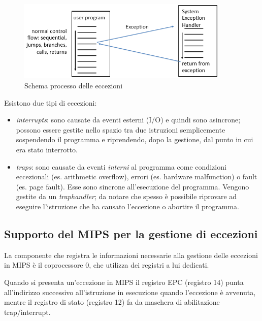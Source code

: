 \documentclass[class=book, crop=false, oneside]{standalone}
\begin{document}
\begin{figure}[!h]
	\centering
	\includegraphics[width=0.9\textwidth,keepaspectratio]{schema-eccezioni}
	\caption{Schema processo delle eccezioni}
\end{figure}
Esistono due tipi di eccezioni:
\begin{itemize}
	\item \emph{interrupts}: sono causate da eventi esterni (I/O) e quindi sono asincrone; possono essere gestite nello spazio tra due istruzioni semplicemente sospendendo il programma e riprendendo, dopo la gestione, dal punto in cui era stato interrotto.
	\item \emph{traps}: sono causate da eventi \emph{interni} al programma come condizioni eccezionali (es. arithmetic overflow), errori (es. hardware malfunction) o fault (es. page fault). Esse sono sincrone all'esecuzione del programma. Vengono gestite da un \emph{traphandler}; da notare che spesso è possibile riprovare ad eseguire l'istruzione che ha causato l'eccezione o abortire il programma.
\end{itemize}

\subsection{Supporto del MIPS per la gestione di eccezioni}
La componente che registra le informazioni necessarie alla gestione delle eccezioni in MIPS è il coprocessore 0, che utilizza dei registri a lui dedicati.

Quando si presenta un'eccezione in MIPS il registro EPC (registro 14) punta all'indirizzo successivo all'istruzione in esecuzione quando l'eccezione è avvenuta, mentre il registro di stato (registro 12) fa da maschera di abilitazione trap/interrupt.
\end{document}
